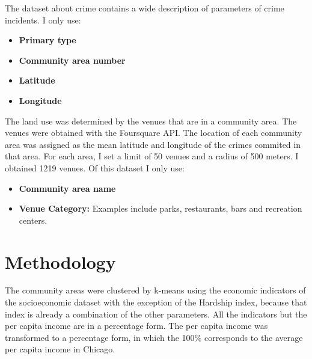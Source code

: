 \documentclass[a4paper,12pt]{article}
\begin{document}
The dataset about crime contains a wide description of parameters of crime incidents. I only use:
\begin{itemize}
\item \textbf{Primary type}
\item \textbf{Community area number}
\item \textbf{Latitude}
\item \textbf{Longitude}
\end{itemize}

The land use was determined by the venues that are in a community area. The venues were obtained with the Foursquare API. The location of each community area was assigned as the mean latitude and longitude of the crimes commited in that area. For each area, I set a limit of 50 venues and a radius of 500 meters. I obtained 1219 venues. Of this dataset I only use:
\begin{itemize}
\item \textbf{Community area name}
\item \textbf{Venue Category:} Examples include parks, restaurants, bars and recreation centers.
\end{itemize}  

\section{Methodology}
The community areas were clustered by k-means using the economic indicators of the socioeconomic dataset with the exception of the Hardship index, because that index is already a combination of the other parameters. All the indicators but the per capita income are in a percentage form. The per capita income was transformed to a percentage form, in which the 100\% corresponds to the average per capita income in Chicago. 
\end{document}
